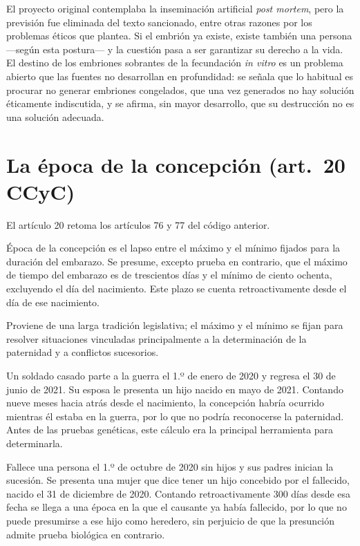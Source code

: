 \documentclass[12pt,oneside]{book}
\begin{document}
El proyecto original contemplaba la inseminación artificial \textit{post mortem}, pero la previsión fue eliminada del texto sancionado, entre otras razones por los problemas éticos que plantea. Si el embrión ya existe, existe también una persona ---según esta postura--- y la cuestión pasa a ser garantizar su derecho a la vida. El destino de los embriones sobrantes de la fecundación \textit{in vitro} es un problema abierto que las fuentes no desarrollan en profundidad: se señala que lo habitual es procurar no generar embriones congelados, que una vez generados no hay solución éticamente indiscutida, y se afirma, sin mayor desarrollo, que su destrucción no es una solución adecuada.

\section{La época de la concepción (art.~20 CCyC)}

El artículo 20 retoma los artículos 76 y 77 del código anterior.

\begin{regla}
Época de la concepción es el lapso entre el máximo y el mínimo fijados para la duración del embarazo. Se presume, excepto prueba en contrario, que el máximo de tiempo del embarazo es de trescientos días y el mínimo de ciento ochenta, excluyendo el día del nacimiento. Este plazo se cuenta retroactivamente desde el día de ese nacimiento.
\end{regla}

Proviene de una larga tradición legislativa; el máximo y el mínimo se fijan para resolver situaciones vinculadas principalmente a la determinación de la paternidad y a conflictos sucesorios.

\begin{ejemplo}
Un soldado casado parte a la guerra el 1.º de enero de 2020 y regresa el 30 de junio de 2021. Su esposa le presenta un hijo nacido en mayo de 2021. Contando nueve meses hacia atrás desde el nacimiento, la concepción habría ocurrido mientras él estaba en la guerra, por lo que no podría reconocerse la paternidad. Antes de las pruebas genéticas, este cálculo era la principal herramienta para determinarla.
\end{ejemplo}

\begin{ejemplo}
Fallece una persona el 1.º de octubre de 2020 sin hijos y sus padres inician la sucesión. Se presenta una mujer que dice tener un hijo concebido por el fallecido, nacido el 31 de diciembre de 2020. Contando retroactivamente 300 días desde esa fecha se llega a una época en la que el causante ya había fallecido, por lo que no puede presumirse a ese hijo como heredero, sin perjuicio de que la presunción admite prueba biológica en contrario.
\end{ejemplo}
\end{document}
